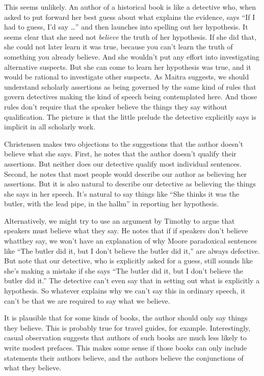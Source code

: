 \documentclass[11pt,]{book}
\begin{document}
This seems unlikely. An author of a historical book is like a detective who, when asked to put forward her best guess about what explains the evidence, says ``If I had to guess, I'd say \ldots{}'' and then launches into spelling out her hypothesis. It seems clear that she need not \emph{believe} the truth of her hypothesis. If she did that, she could not later learn it was true, because you can't learn the truth of something you already believe. And she wouldn't put any effort into investigating alternative suspects. But she can come to learn her hypothesis was true, and it would be rational to investigate other suspects. As Maitra suggests, we should understand scholarly assertions as being governed by the same kind of rules that govern detectives making the kind of speech being contemplated here. And those rules don't require that the speaker believe the things they say without qualification. The picture is that the little prelude the detective explicitly says is implicit in all scholarly work.

Christensen makes two objections to the suggestions that the author doesn't believe what she says. First, he notes that the author doesn't qualify their assertions. But neither does our detective qualify most individual sentences. Second, he notes that most people would describe our author as believing her assertions. But it is also natural to describe our detective as believing the things she says in her speech. It's natural to say things like ``She thinks it was the butler, with the lead pipe, in the hallm'' in reporting her hypothesis.

Alternatively, we might try to use an argument by Timothy \citet{Williamson2000} to argue that speakers must believe what they say. He notes that if if speakers don't believe whatthey say, we won't have an explanation of why Moore paradoxical sentences like ``The butler did it, but I don't believe the butler did it,'' are always defective. But note that our detective, who is explicitly asked for a guess, still sounds like she's making a mistake if she says ``The butler did it, but I don't believe the butler did it.'' The detective can't even say that in setting out what is explicitly a hypothesis. So whatever explains why we can't say this in ordinary speech, it can't be that we are required to say what we believe.

It is plausible that for some kinds of books, the author should only say things they believe. This is probably true for travel guides, for example. Interestingly, casual observation suggests that authors of such books are much less likely to write modest prefaces. This makes some sense if those books can only include statements their authors believe, and the authors believe the conjunctions of what they believe.
\end{document}
